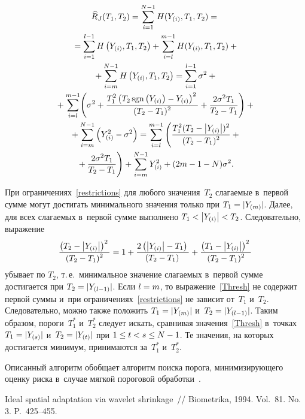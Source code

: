 \begin{multicols}{2}
\noindent
\begin{multline}
\widehat{R}_J(T_1,T_2)=\sum_{i=1}^{N-1}H(Y_{(i)},T_1,T_2)={}\\
{}=\sum\limits_{i=1}^{l-1}H\left(Y_{(i)},T_1,T_2\right)+\sum_{i=l}^{m-1}H(Y_{(i)},T_1,T_2)+{}\\
{}+
\sum\limits_{i=m}^{N-1}H\left(Y_{(i)},T_1,T_2\right)=\sum\limits_{i=1}^{l-1}\sigma^2+{}\\
{}+
\sum\limits_{i=l}^{m-1}\!\left(\sigma^2+\displaystyle\frac{\displaystyle T^2_1\left(T_2\,\mathrm{sgn}\left(Y_{(i)}\right)-Y_{(i)}\right)^2\mathstrut}{\displaystyle (T_2-T_1)^2\mathstrut}+
\displaystyle\frac{\displaystyle 2\sigma^2T_1\mathstrut}{\displaystyle T_2-T_1\mathstrut}\right)+{}\\
{}+ \sum\limits_{i=m}^{N-1}\left(Y^2_{(i)}-\sigma^2\right)=
\sum\limits_{i=l}^{m-1}\Bigg(\displaystyle\frac{\displaystyle T^2_1(T_2- \left\vert Y_{(i)}\right\vert)^2\mathstrut}{\displaystyle (T_2-T_1)^2\mathstrut}+{}\\
{}+\displaystyle\frac{\displaystyle 2\sigma^2T_1\mathstrut}{\displaystyle T_2-T_1\mathstrut}\Bigg)+
\sum\limits_{i=m}^{N-1}Y^2_{(i)}+(2m-1-N)\sigma^2.
\label{Thresh}
\end{multline}

\vspace*{-3pt}

\noindent
При ограничениях~\eqref{restrictions} для любого значения~$T_2$ слагаемые 
в~первой сумме могут достигать минимального значения только при $T_1\hm=|Y_{(m)}|$. 
Далее,
для всех слагаемых в~первой сумме  выполнено $T_1<\left\vert Y_{(i)}\right\vert<T_2$. 
Следовательно, выражение
$$
\displaystyle\frac{\displaystyle \left(T_2- \left\vert Y_{(i)}\right\vert\right)^2\mathstrut}{\displaystyle (T_2-T_1)^2\mathstrut}=1+\displaystyle\frac{\displaystyle 2\left(\left\vert Y_{(i)}\right\vert-T_1\right)\mathstrut}{\displaystyle \left(T_2-T_1\right)\mathstrut}+
\displaystyle\frac{\displaystyle \left(T_1-\left\vert Y_{(i)}\right\vert\right)^2\mathstrut}{\displaystyle (T_2-T_1)^2\mathstrut}
$$
убывает по $T_2$, т.\,е.\ минимальное значение сла\-га\-емых в~первой сумме 
достигается при $T_2\hm=|Y_{(l-1)}|$.  Если $l\hm=m$, то выражение~\eqref{Thresh} не 
содержит первой суммы и~при ограничениях~\eqref{restrictions} не зависит от~$T_1$ 
и~$T_2$. Следовательно, можно также положить $T_1\hm=|Y_{(m)}|$ и~$T_2\hm=|Y_{(l\hm-1)}|$. Таким образом, 
пороги~$T^*_1$ и~$T^*_2$ следует искать, сравнивая значения~\eqref{Thresh} в~точках 
$T_1\hm=|Y_{(s)}|$ и~$T_2\hm=|Y_{(t)}|$ при $1\hm\leq t\hm<s\hm\leq N\hm-1$. Те значения, на которых достигается минимум, принимаются за~$T^*_1$ 
и~$T^*_2$.

Описанный алгоритм обобщает алгоритм поиска порога, минимизирующего оценку риска в~случае мягкой пороговой обработки~\cite{Mall99}.

\vspace*{-5pt}

{\small\frenchspacing
 {\baselineskip=10.9pt
 \begin{thebibliography}{99}
 Ideal spatial adaptation via wavelet 
shrinkage~// Biometri\-ka, 1994. Vol.~81. No.\,3.
P.~425--455.


\end{thebibliography}}}
\end{multicols}
